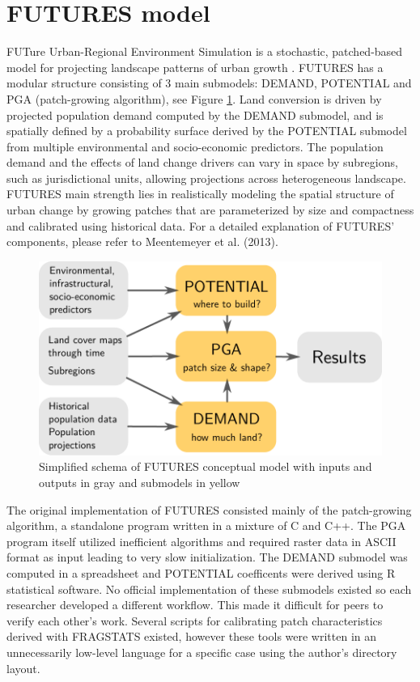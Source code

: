 \documentclass{isprs}
\begin{document}
\section{FUTURES model}
FUTure Urban-Regional Environment Simulation
is a stochastic, patched-based model
for projecting landscape patterns of urban growth \cite{Meentemeyer2012}.
FUTURES has a modular structure consisting of 3 main submodels: DEMAND, POTENTIAL and
PGA (patch-growing algorithm), see Figure \ref{fig:schema}.
Land conversion is driven by projected population demand computed by the DEMAND submodel,
and is spatially defined by a probability surface derived by  the POTENTIAL submodel
from multiple environmental and socio-economic predictors.
The population demand and the effects of land change drivers can vary in space by subregions,
such as jurisdictional units, allowing projections across heterogeneous landscape.
FUTURES main strength lies in realistically modeling the 
spatial structure of urban change by growing patches 
that are
parameterized by size and compactness 
and calibrated using historical data.
For a detailed explanation of FUTURES' components, please refer to Meentemeyer et al. (2013).

\begin{figure}[h!]
 \centering
 \includegraphics[width=0.9\columnwidth]{./figures/schema.pdf}
 \caption{Simplified schema of FUTURES conceptual model  with inputs and outputs in gray and submodels in yellow}
 \label{fig:schema}
\end{figure}


The original implementation of FUTURES consisted mainly of the patch-growing 
algorithm, a standalone program written in a mixture of C and C++.
The PGA program itself utilized inefficient algorithms and required raster data in ASCII
format as input leading to very slow initialization. %
The DEMAND submodel was computed in a spreadsheet and POTENTIAL coefficents
were derived using R statistical software. No official
implementation of these submodels existed so each researcher
developed a different workflow. This made it difficult for peers to verify each other's work. 
%
Several scripts for calibrating patch 
characteristics derived with FRAGSTATS \cite{fragstats} existed, however these tools
were written 
in an unnecessarily low-level language
for a specific case 
using the author's directory layout.
\end{document}
